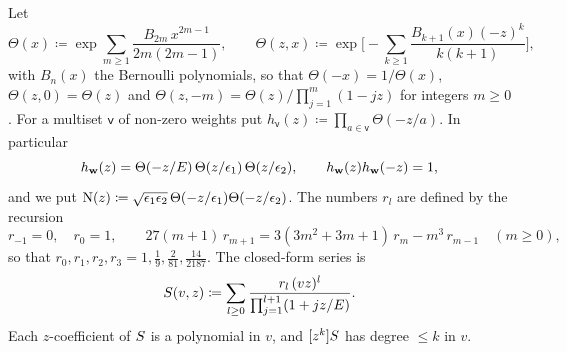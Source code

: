 Let
\[
\Theta(x)\coloneqq\exp\sum_{m\geq1}\frac{B_{2m}\,x^{2m-1}}{2m(2m-1)},\qquad
\Theta(z,x)\coloneqq\exp\Big[-\sum_{k\geq1}\frac{B_{k+1}(x)(-z)^k}{k(k+1)}\Big],
\]
with $B_n(x)$ the Bernoulli polynomials, so that $\Theta(-x)=1/\Theta(x)$, $\Theta(z,0)=\Theta(z)$ and $\Theta(z,-m)=\Theta(z)/\prod_{j=1}^{m}(1-jz)$ for integers $m\geq0$. For a multiset $\mathsf{v}$ of non-zero weights put $h_{\mathsf{v}}(z)\coloneqq\prod_{a\in\mathsf{v}}\Theta(-z/a)$. In particular
\begin{equation}
\label{eq:set-hw}
h_{\mathbf{w}}(z)=\Theta(-z/E)\,\Theta(z/\epsilon_1)\,\Theta(z/\epsilon_2),\qquad h_{\mathbf{w}}(z)h_{\mathbf{w}}(-z)=1,
\end{equation}
and we put $\mathrm{N}(z)\coloneqq\sqrt{\epsilon_1\epsilon_2}\,\Theta(-z/\epsilon_1)\Theta(-z/\epsilon_2)$. The numbers $r_l$ are defined by the recursion
\begin{equation}
\label{eq:set-rec}
r_{-1}=0,\quad r_0=1,\qquad 27(m+1)\,r_{m+1}=3(3m^2+3m+1)\,r_m-m^3\,r_{m-1}\quad(m\geq0),
\end{equation}
so that $r_0,r_1,r_2,r_3=1,\frac19,\frac2{81},\frac{14}{2187}$. The closed-form series is
\begin{equation}
\label{eq:set-S}
S(v,z)\coloneqq\sum_{l\geq0}\frac{r_l\,(vz)^l}{\prod_{j=1}^{l+1}(1+jz/E)}.
\end{equation}
Each $z$-coefficient of $S$ is a polynomial in $v$, and $[z^k]S$ has degree $\leq k$ in $v$.
